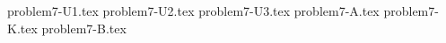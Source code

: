 \documentclass{article}
\begin{document}
{problem7-U1.tex}
{problem7-U2.tex}
{problem7-U3.tex}
{problem7-A.tex}
{problem7-K.tex}
{problem7-B.tex}
\end{document}
